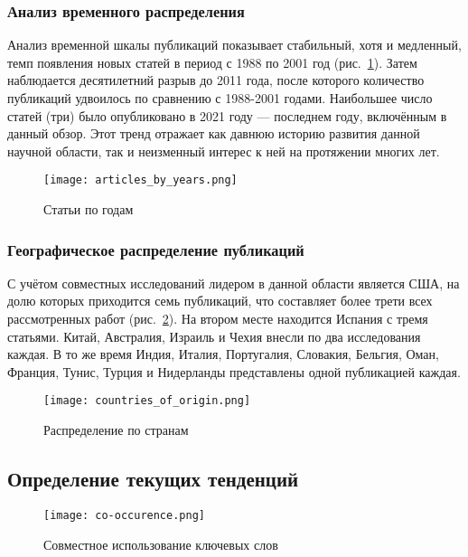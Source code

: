 \subsubsection{Анализ временного распределения}

Анализ временной шкалы публикаций показывает стабильный, хотя и медленный,
темп появления новых статей в период с 1988 по 2001 год (рис.~\ref{fig:articles-by-year}).
Затем наблюдается десятилетний разрыв до 2011 года,
после которого количество публикаций удвоилось по сравнению с 1988-2001 годами.
Наибольшее число статей (три) было опубликовано в 2021 году
--- последнем году, включённым в данный обзор.
Этот тренд отражает как давнюю историю развития данной научной области,
так и неизменный интерес к ней на протяжении многих лет.

\begin{figure}
  \centering
  \texttt{[image: articles\_by\_years.png]}
  \caption{Статьи по годам}
  \label{fig:articles-by-year}
\end{figure}

\subsubsection{Географическое распределение публикаций}

С учётом совместных исследований лидером в данной области является США,
на долю которых приходится семь публикаций,
что составляет более трети всех рассмотренных работ (рис.~\ref{fig:countries-of-origin}).
На втором месте находится Испания с тремя статьями.
Китай, Австралия, Израиль и Чехия внесли по два исследования каждая.
В то же время Индия, Италия, Португалия, Словакия, Бельгия, Оман, Франция, Тунис, Турция и Нидерланды представлены одной публикацией каждая.

\begin{figure}
  \centering
  \texttt{[image: countries\_of\_origin.png]}
  \caption{Распределение по странам}
  \label{fig:countries-of-origin}
\end{figure}

\subsection{Определение текущих тенденций}

\begin{figure}
  \centering
  \texttt{[image: co-occurence.png]}
  \caption{Совместное использование ключевых слов}
  \label{fig:co-occurence}
\end{figure}

